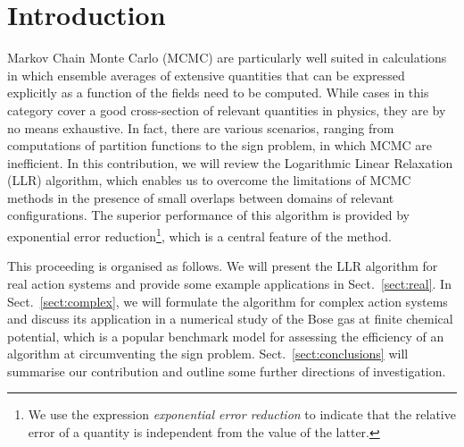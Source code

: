 \documentclass[a4paper]{jpconf}
\begin{document}
\section{Introduction}
Markov Chain Monte Carlo (MCMC) are particularly well suited in
calculations in which ensemble averages of extensive quantities that
can be expressed explicitly as a 
function of the fields need to be computed. While cases in this
category cover a good cross-section of relevant quantities in
physics, they are by no means exhaustive. In fact, there are various
scenarios, ranging from computations of partition functions to the
sign problem, in which MCMC are inefficient. 
In this contribution, we will review the Logarithmic Linear Relaxation
(LLR) algorithm, which enables us to overcome the limitations of MCMC
methods in the presence of small overlaps between domains of relevant
configurations. The superior performance of this algorithm is provided
by exponential error reduction\footnote{We use the expression {\em
    exponential error reduction} to indicate that the relative error
  of a quantity is independent from the value of the latter.}, which
is a central feature of the method.

This proceeding is organised as follows. We will present the LLR
algorithm for real action systems and provide some example
applications in Sect.~\ref{sect:real}. In Sect.~\ref{sect:complex}, we will
formulate the algorithm for complex action systems and discuss
its application in a numerical study of the Bose gas at finite
chemical potential, which is a popular benchmark model for assessing
the efficiency of an algorithm at circumventing the sign
problem. Sect.~\ref{sect:conclusions} will summarise our contribution and
outline some further directions of investigation.  
\end{document}
